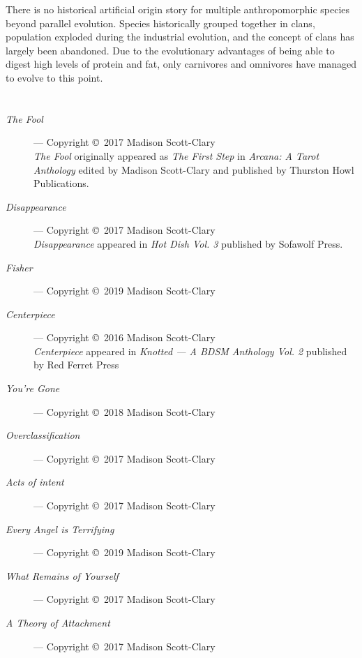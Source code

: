 There is no historical artificial origin story for multiple anthropomorphic species beyond parallel evolution. Species historically grouped together in clans, population exploded during the industrial evolution, and the concept of clans has largely been abandoned. Due to the evolutionary advantages of being able to digest high levels of protein and fat, only carnivores and omnivores have managed to evolve to this point.

\chapter*{}

\begin{description}
    \item[\emph{The Fool}]
    --- Copyright \copyright\ 2017 Madison Scott-Clary\\
    \emph{The Fool} originally appeared as \emph{The First Step} in \emph{Arcana: A Tarot Anthology} edited by Madison Scott-Clary and published by Thurston Howl Publications.
    \item[\emph{Disappearance}]
    --- Copyright \copyright\ 2017 Madison Scott-Clary\\
    \emph{Disappearance} appeared in \emph{Hot Dish Vol. 3} published by Sofawolf Press.
    \item[\emph{Fisher}]
    --- Copyright \copyright\ 2019 Madison Scott-Clary
    \item[\emph{Centerpiece}]
    --- Copyright \copyright\ 2016 Madison Scott-Clary\\
    \emph{Centerpiece} appeared in \emph{Knotted --- A BDSM Anthology Vol. 2} published by Red Ferret Press
    \item[\emph{You're Gone}]
    --- Copyright \copyright\ 2018 Madison Scott-Clary
    \item[\emph{Overclassification}]
    --- Copyright \copyright\ 2017 Madison Scott-Clary
    \item[\emph{Acts of intent}]
    --- Copyright \copyright\ 2017 Madison Scott-Clary
    \item[\emph{Every Angel is Terrifying}]
    --- Copyright \copyright\ 2019 Madison Scott-Clary
    \item[\emph{What Remains of Yourself}]
    --- Copyright \copyright\ 2017 Madison Scott-Clary
    \item[\emph{A Theory of Attachment}]
    --- Copyright \copyright\ 2017 Madison Scott-Clary
\end{description}

